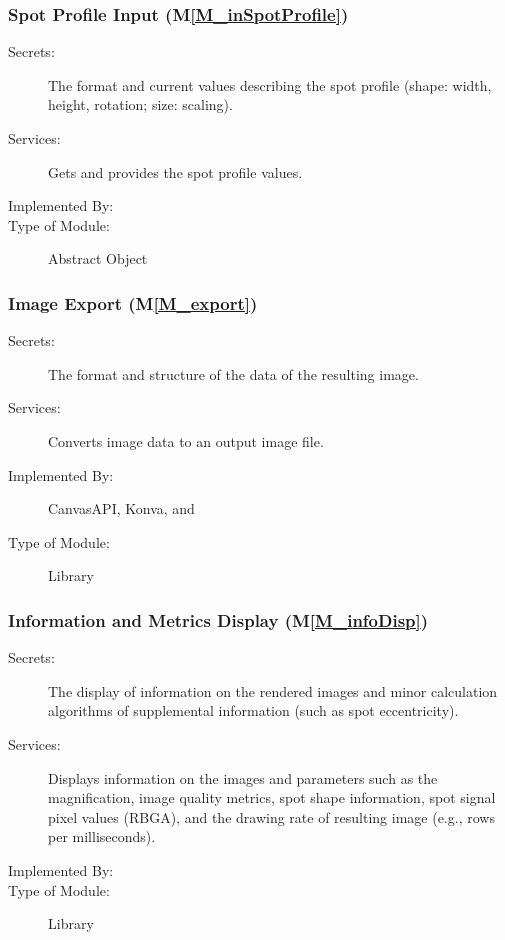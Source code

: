 \documentclass[12pt, titlepage]{article}
\newcommand{\mref}[1]{M\ref{#1}}
\begin{document}
\subsubsection{Spot Profile Input (\mref{M_inSpotProfile})}
\begin{description}
\item[Secrets:]The format and current values describing the spot profile
  (shape: width, height, rotation; size: scaling).
\item[Services:]Gets and provides the spot profile values.
\item[Implemented By:] \progname{}
\item[Type of Module:] Abstract Object
\end{description}


\subsubsection{Image Export (\mref{M_export})}
\begin{description}
\item[Secrets:]The format and structure of the data of the resulting image.
\item[Services:]Converts image data to an output image file.
\item[Implemented By:] CanvasAPI, Konva, and \progname{}
\item[Type of Module:] Library
\end{description}


\subsubsection{Information and Metrics Display (\mref{M_infoDisp})}
\begin{description}
\item[Secrets:]The display of information on the rendered
  images and minor calculation algorithms of supplemental information (such as spot eccentricity).
\item[Services:]Displays information on the images and parameters such as the magnification,
  image quality metrics, spot shape information, spot signal pixel values (RBGA),
  and the drawing rate of resulting image (e.g., rows per milliseconds).
\item[Implemented By:] \progname{}
\item[Type of Module:] Library
\end{description}
\end{document}
